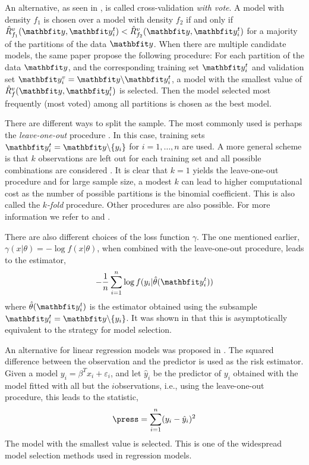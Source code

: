 An alternative, as seen in \cite{Yang:2007vx}, is called cross-validation
\emph{with vote}. A model with density $f_1$ is chosen over a model with
density $f_2$ if and only if $\hat{R}_{f_1}^v(\data,\data_i^t) <
\hat{R}_{f_2}^v(\data,\data_i^t)$ for a majority of the partitions of the data
$\data$. When there are multiple candidate models, the same paper propose the
following procedure: For each partition of the data $\data$, and the
corresponding training set $\data_i^t$ and validation set $\data_i^v =
\data\backslash\data_i^t$, a model with the smallest value of
$\hat{R}_f^v(\data,\data_i^t)$ is selected. Then the model selected most
frequently (most voted) among all partitions is chosen as the best model.

There are different ways to split the sample. The most commonly used is
perhaps the \emph{leave-one-out} procedure \cite{Stone:1974vx,Geisser:1975vx}.
In this case, training sets $\data_i^t = \data\backslash\{y_i\}$ for $i =
1,\dots,n$ are used. A more general scheme is that $k$ observations are left
out for each training set and all possible combinations are considered
\cite{Shao:1993vx}.  It is clear that $k=1$ yields the leave-one-out procedure
and for large sample size, a modest $k$ can lead to higher computational cost
as the number of possible partitions is the binomial coefficient. This is also
called the $k$\emph{-fold} procedure. Other procedures are also possible. For
more information we refer to \cite{Stone:1978vx} and \cite{Hjorth:1994vx}.

There are also different choices of the loss function $\gamma$. The one
mentioned earlier, $\gamma(x|\theta) = -\log f(x|\theta)$, when combined with
the leave-one-out procedure, leads to the estimator,
\begin{equation}
  -\frac{1}{n}\sum_{i=1}^n\log f(y_i|\hat\theta(\data_i^t))
\end{equation}
where $\hat\theta(\data_i^t)$ is the estimator obtained using the subsample
$\data_i^t = \data\backslash\{y_i\}$. It was shown in \cite{Stone:1978vx} that
this is asymptotically equivalent to the \aic strategy for model selection.

An alternative for linear regression models was proposed in
\cite{Allen:1974vx}. The squared difference between the observation and the
predictor is used as the risk estimator. Given a model $y_i = \beta^T x_i +
\varepsilon_i$, and let $\hat{y}_i$ be the predictor of $y_i$ obtained with
the model fitted with all but the $i$\xth observations, i.e., using the
leave-one-out procedure, this leads to the \press statistic,
\begin{equation}
  \press = \sum_{i=1}^n(y_i - \hat{y}_i)^2
\end{equation}
The model with the smallest \press value is selected. This is one of the
widespread model selection methods used in regression models.

